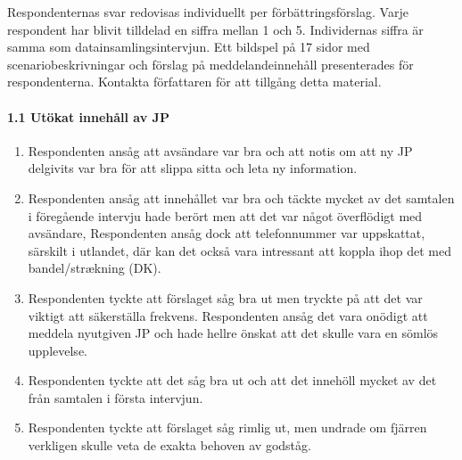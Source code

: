 Respondenternas svar redovisas individuellt per förbättringsförslag.
Varje respondent har blivit tilldelad en siffra mellan 1 och 5.
Individernas siffra är samma som datainsamlingsintervjun.
Ett bildspel på 17 sidor med scenariobeskrivningar och förslag på meddelandeinnehåll presenterades för respondenterna.
Kontakta författaren för att tillgång detta material.
\paragraph{1.1 Utökat innehåll av JP}
\hspace{-12pt}
\begin{enumerate}
    \item Respondenten ansåg att avsändare var bra och att notis om att ny JP delgivits var bra för att slippa sitta och leta ny information.
    \item Respondenten ansåg att innehållet var bra och täckte mycket av det samtalen i föregående intervju hade berört men att det var något överflödigt med avsändare,
    Respondenten ansåg dock att telefonnummer var uppskattat, särskilt i utlandet, där kan det också vara intressant att koppla ihop det med bandel/strækning (DK).
    \item Respondenten tyckte att förslaget såg bra ut men tryckte på att det var viktigt att säkerställa frekvens.
    Respondenten ansåg det vara onödigt att meddela nyutgiven JP och hade hellre önskat att det skulle vara en sömlös upplevelse.
    \item Respondenten tyckte att det såg bra ut och att det innehöll mycket av det från samtalen i första intervjun.
    \item Respondenten tyckte att förslaget såg rimlig ut, men undrade om fjärren verkligen skulle veta de exakta behoven av godståg.
\end{enumerate}
